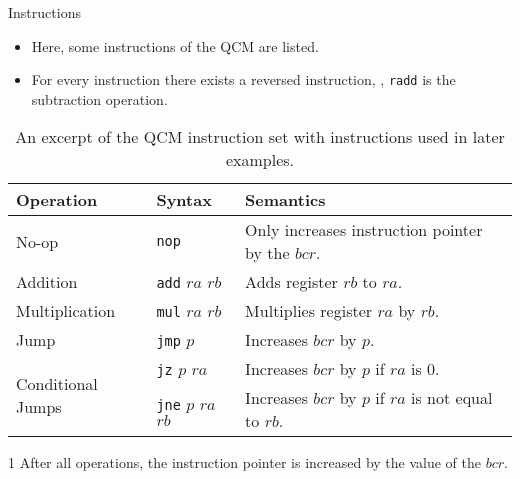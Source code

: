 \begin{frame}{Instructions}
    \begin{itemize}
        \item Here, some instructions of the QCM are listed.
        \item For every instruction there exists a reversed instruction, \eg, \texttt{radd} is the subtraction operation.
    \end{itemize}
    \begin{table}[htp]
        \centering
        \begin{threeparttable}[b]
            \begin{tabular}{llp{}}
                \multicolumn{1}{l|}{Operation}                          & \multicolumn{1}{l|}{Syntax}                                      & Semantics\tnote{1}                                                              \\ \hline
                
                \multicolumn{1}{l|}{No-op}                              & \multicolumn{1}{l|}{\texttt{nop}}               & Only increases instruction pointer by the $bcr$.     \\ \hline
                
                \multicolumn{1}{l|}{Addition}                           & \multicolumn{1}{l|}{\texttt{add} $ra$ $rb$}     & Adds register $rb$ to $ra$.                                            \\
                \multicolumn{1}{l|}{Multiplication}                     & \multicolumn{1}{l|}{\texttt{mul} $ra$ $rb$}     & Multiplies register $ra$ by $rb$.                                      \\ \hline
                
                \multicolumn{1}{l|}{Jump}                               & \multicolumn{1}{l|}{\texttt{jmp} $p$}           & Increases $bcr$ by $p$.                              \\ \hline
                \multicolumn{1}{l|}{\multirow{2}{*}{Conditional Jumps}} & \multicolumn{1}{l|}{\texttt{jz} $p$ $ra$}       & Increases $bcr$ by $p$ if $ra$ is $0$.               \\
                \multicolumn{1}{l|}{}                                   & \multicolumn{1}{l|}{\texttt{jne} $p$ $ra$ $rb$} & Increases $bcr$ by $p$ if $ra$ is not equal to $rb$. 
            \end{tabular}
            \begin{tablenotes}
                \item [1] After all operations, the instruction pointer is increased by the value of the $bcr$.
            \end{tablenotes}
        \end{threeparttable}
        \caption{An excerpt of the QCM instruction set with instructions used in later examples.}
        \label{tab:qcm_instructionset}
    \end{table}
\end{frame}

